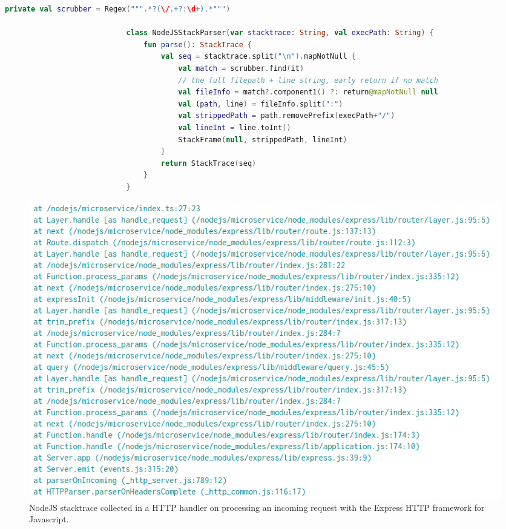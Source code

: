 \documentclass[12pt,pdftex,titlepage]{report}
\begin{document}
                    \begin{spacing}{1.0}
                        \begin{lstlisting}[language=Kotlin, gobble=28, label={lst:nodeparser}, caption={The NodeJS Stack parser class }]
                            private val scrubber = Regex(""".*?(\/.+?:\d+).*""")

                            class NodeJSStackParser(var stacktrace: String, val execPath: String) {
                                fun parse(): StackTrace {
                                    val seq = stacktrace.split("\n").mapNotNull {
                                        val match = scrubber.find(it)
                                        // the full filepath + line string, early return if no match
                                        val fileInfo = match?.component1() ?: return@mapNotNull null
                                        val (path, line) = fileInfo.split(":")
                                        val strippedPath = path.removePrefix(execPath+"/")
                                        val lineInt = line.toInt()
                                        StackFrame(null, strippedPath, lineInt)
                                    }
                                    return StackTrace(seq)
                                }
                            }
                        \end{lstlisting}
                    \end{spacing}

                    \medskip
                    \begin{figure}[hbt!]
                        \centering
                        \includegraphics[scale=1.6]{nodejsstack.png}
                        \caption{NodeJS stacktrace collected in a HTTP handler on processing an incoming request with the Express HTTP framework for Javascript.}
                        \label{fig:nodejsstack}
                    \end{figure}
                    
\end{document}

